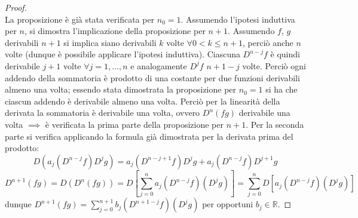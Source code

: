 \documentclass[10pt, oneside]{book}
\theoremstyle{plain}
\begin{document}
\begin{proof}
\\La proposizione è già stata verificata per $n_0 = 1$. Assumendo l'ipotesi induttiva per $n$, si dimostra l'implicazione della proposizione per $n+1$. Assumendo $f$, $g$ derivabili $n+1$ si implica siano derivabili $k$ volte $\forall 0 < k \leq n+1$, perciò anche $n$ volte (dunque è possibile applicare l'ipotesi induttiva). Ciascuna $D^{n-j}f$ è quindi derivabile $j+1$ volte $\forall j = 1, ..., n$ e analogamente $D^{j}f$ $n+1-j$ volte. Perciò ogni addendo della sommatoria è prodotto di una costante per due funzioni derivabili almeno una volta; essendo stata dimostrata la proposizione per $n_0 = 1$ si ha che ciascun addendo è derivabile almeno una volta. Perciò per la linearità della derivata la sommatoria è derivabile una volta, ovvero $D^n(fg)$ derivabile una volta $\implies$ è verificata la prima parte della proposizione per $n+1$. Per la seconda parte si verifica applicando la formula già dimostrata per la derivata prima del prodotto:
\[D(a_j(D^{n-j}f)D^jg) = a_j(D^{n-j+1}f)D^jg + a_j(D^{n-j}f)D^{j+1}g\]
\[D^{n+1}(fg) = D(D^n(fg)) = D [\sum \limits_{j=0}^{n} a_j (D^{n-j}f)(D^jg)] = \sum \limits_{j=0}^{n} D[ a_j (D^{n-j}f)(D^jg)]\]
dunque $D^{n+1}(fg) = \sum \limits_{j=0}^{n+1} b_j (D^{n+1-j}f)(D^jg)$ per opportuni $b_j \in \mathbb{R}$.
\end{proof}
\end{document}
